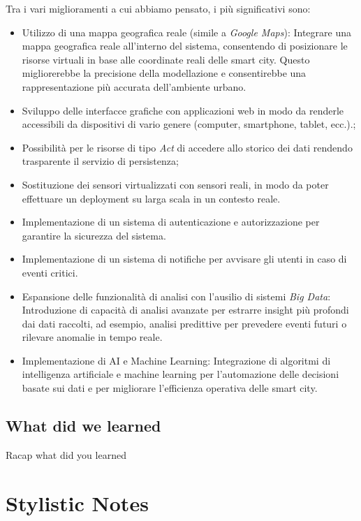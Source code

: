 \documentclass{scrartcl}
\begin{document}
Tra i vari miglioramenti a cui abbiamo pensato, i più significativi sono:
\begin{itemize}
    \item Utilizzo di una mappa geografica reale (simile a \textit{Google Maps}): Integrare una mappa geografica reale all'interno del sistema, consentendo di posizionare le risorse virtuali in base alle coordinate reali delle smart city. Questo migliorerebbe la precisione della modellazione e consentirebbe una rappresentazione più accurata dell'ambiente urbano.
    \item Sviluppo delle interfacce grafiche con applicazioni web in modo da renderle accessibili da dispositivi di vario genere (computer, smartphone, tablet, ecc.).;
    \item Possibilità per le risorse di tipo \textit{Act} di accedere allo storico dei dati rendendo trasparente il servizio di persistenza;
    \item Sostituzione dei sensori virtualizzati con sensori reali, in modo da poter effettuare un deployment su larga scala in un contesto reale.
    \item Implementazione di un sistema di autenticazione e autorizzazione per garantire la sicurezza del sistema.
    \item Implementazione di un sistema di notifiche per avvisare gli utenti in caso di eventi critici.
    \item Espansione delle funzionalità di analisi con l'ausilio di sistemi \textit{Big Data}: Introduzione di capacità di analisi avanzate per estrarre insight più profondi dai dati raccolti, ad esempio, analisi predittive per prevedere eventi futuri o rilevare anomalie in tempo reale.
    \item Implementazione di AI e Machine Learning: Integrazione di algoritmi di intelligenza artificiale e machine learning per l'automazione delle decisioni basate sui dati e per migliorare l'efficienza operativa delle smart city.
\end{itemize}

\subsection{What did we learned}

Racap what did you learned

\section*{Stylistic Notes}
\end{document}
